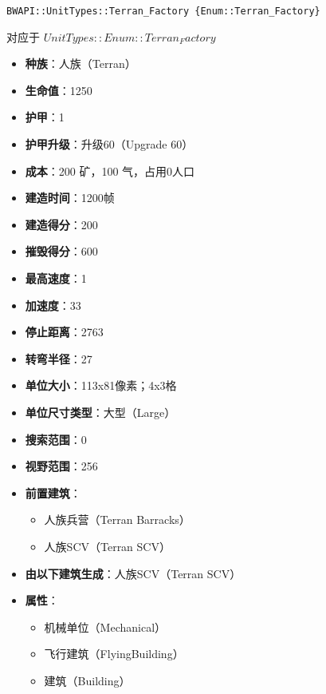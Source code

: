 \begin{tcolorbox}[colback=white, colframe=black!60!white, title=Terran\_Factory(), arc=0mm]
    \begin{verbatim}
BWAPI::UnitTypes::Terran_Factory {Enum::Terran_Factory}
    \end{verbatim}
    对应于  $ UnitTypes::Enum::Terran_Factory $ 
    \begin{itemize}
        \item \textbf{种族}：人族（Terran）
        \item \textbf{生命值}：1250
        \item \textbf{护甲}：1
        \item \textbf{护甲升级}：升级60（Upgrade 60）
        \item \textbf{成本}：200 矿，100 气，占用0人口
        \item \textbf{建造时间}：1200帧
        \item \textbf{建造得分}：200
        \item \textbf{摧毁得分}：600
        \item \textbf{最高速度}：1
        \item \textbf{加速度}：33
        \item \textbf{停止距离}：2763
        \item \textbf{转弯半径}：27
        \item \textbf{单位大小}：113x81像素；4x3格
        \item \textbf{单位尺寸类型}：大型（Large）
        \item \textbf{搜索范围}：0
        \item \textbf{视野范围}：256
        \item \textbf{前置建筑}：
            \begin{itemize}
                \item 人族兵营（Terran Barracks）
                \item 人族SCV（Terran SCV）
            \end{itemize}
        \item \textbf{由以下建筑生成}：人族SCV（Terran SCV）
        \item \textbf{属性}：
            \begin{itemize}
                \item 机械单位（Mechanical）
                \item 飞行建筑（FlyingBuilding）
                \item 建筑（Building）
            \end{itemize}
    \end{itemize}
\end{tcolorbox}

